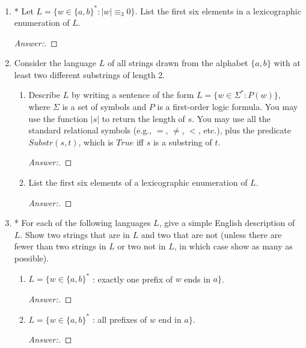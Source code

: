 \documentclass[10pt]{article}
\newcommand{\card}[1]{\left| #1 \right|}
\begin{document}
\begin{enumerate}

\item
* Let $L = \{w \in \{a, b\}^* : \card{w} \equiv _3 0\}$.  List the first six elements in a lexicographic enumeration of $L$.
\begin{proof}[Answer:]
\end{proof}


\item
Consider the language $L$ of all strings drawn from the alphabet $\{a, b\}$ with at least two different substrings of length 2.
\begin{enumerate}

\item
Describe $L$ by writing a sentence of the form $L = \{w \in \Sigma ^* : P(w)\}$, where $\Sigma$ is a set of symbols and $P$ is a first-order logic formula.  You may use the function $\card{s}$ to return the length of $s$.  You may use all the standard relational symbols (e.g., $=$,  $\neq$, $<$, etc.), plus the predicate  $Substr(s,  t)$, which is $True$ iff $s$ is a substring of $t$.
\begin{proof}[Answer:]
\end{proof}

\item
List the first six elements of a lexicographic enumeration of $L$.
\begin{proof}[Answer:]
\end{proof}
\end{enumerate}


\item
* For each of the following languages $L$, give a simple English description of $L$.  Show two strings that are in $L$ and two that are not (unless there are fewer than two strings in $L$ or two not in $L$, in which case show as many as possible).
\begin{enumerate}

\item
$L = \{w \in \{a, b\}^*$ : exactly one prefix of $w$ ends in $a\}$. 
\begin{proof}[Answer:]
\end{proof}

\item
$L = \{w \in \{a, b\}^*$ : all prefixes of $w$ end in $a\}$.
\begin{proof}[Answer:]
\end{proof}


\end{enumerate}
\end{enumerate}
\end{document}
